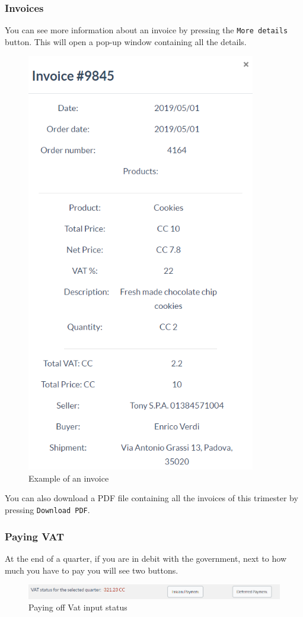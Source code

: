 		\subsubsection{Invoices}
		You can see more information about an invoice by pressing the 
		\texttt{More details} button. This will open a pop-up window containing all 
		the details.
		\begin{figure}[H]
			\includegraphics[width=10cm]{res/images/invoice_details.png}
			\centering
			\caption{Example of an invoice}
		\end{figure}
		\noindent You can also download a PDF file containing all the invoices 
		of this trimester by pressing \texttt{Download PDF}. 
		\subsubsection{Paying VAT}
		At the end of a quarter, if you are in debit with the government, next 
		to how much you have to pay you will see two buttons.
		\begin{figure}[H]
			\includegraphics[width=15cm]{res/images/paying_vat.png}
			\centering
			\caption{Paying off Vat input status}
		\end{figure}
